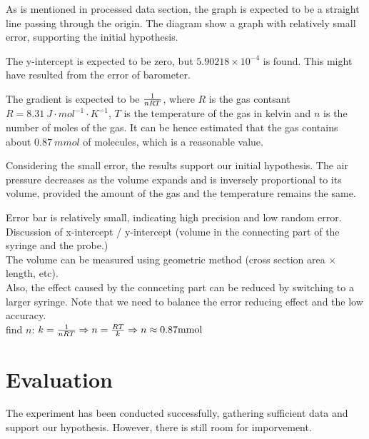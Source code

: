 \documentclass[a4paper]{article}
\begin{document}
As is mentioned in processed data section, the graph is expected to be a straight line passing through the origin. The diagram show a graph with relatively small error, supporting the initial hypothesis. 

The y-intercept is expected to be zero, but $5.90218\times 10^{-4}$ is found. This might have resulted from the error of barometer.

The gradient is expected to be $1\over nRT$, where $R$ is the gas contsant $R = \SI{8.31}{J\cdot mol^{-1}\cdot K^{-1}}$, $T$ is the temperature of the gas in kelvin and $n$ is the number of moles of the gas. It can be hence estimated that the gas contains about $\SI{0.87}{mmol}$ of molecules, which is a reasonable value.

Considering the small error, the results support our initial hypothesis. The air pressure decreases as the volume expands and is inversely proportional to its volume, provided the amount of the gas and the temperature remains the same. 

\begin{tcolorbox}[title = Note]
    Error bar is relatively small, indicating high precision and low random error.
    Discussion of x-intercept / y-intercept (volume in the connecting part of the syringe and the probe.) \\
    The volume can be measured using geometric method (cross section area $\times$ length, etc). \\
    Also, the effect caused by the connceting part can be reduced by switching to a larger syringe. Note that we need to balance the error reducing effect and the low accuracy. \\
    find $n$: $k = {1\over{nRT}} \Rightarrow n = {RT \over k} \Rightarrow n\approx 0.87\SI{}{mmol}$
\end{tcolorbox}

\section{Evaluation}

The experiment has been conducted successfully, gathering sufficient data and support our hypothesis. However, there is still room for imporvement.
\end{document}
